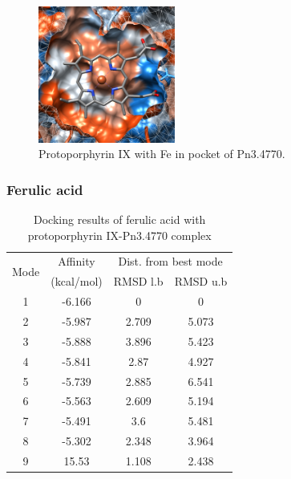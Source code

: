 \documentclass[12pt]{article}
\begin{document}
	\FloatBarrier
	
	\FloatBarrier
	\begin{figure}[h!]
		\centering
		\includegraphics[width=0.4\textwidth]{../5/known/Dock/chimera.png}
		\caption{\centering Protoporphyrin IX with Fe in pocket of Pn3.4770.}
		\label{fig5k_5}
	\end{figure}
	\FloatBarrier
	
	\subsubsection{Ferulic acid}
	
	\begin{table}
		\centering
		\caption{\centering Docking results of ferulic acid with protoporphyrin IX-Pn3.4770 complex}
		\label{table5k_2}
		\begin{tabular}{cccc}
			\toprule
			\multirow{2}{*}{Mode} & Affinity & \multicolumn{2}{c}{Dist. from best mode}\\
			&  (kcal/mol) & RMSD l.b & RMSD u.b\\
			\midrule
			1 & -6.166   &       0   &       0\\
			2 & -5.987   &   2.709   &   5.073\\
			3 & -5.888   &   3.896   &   5.423\\
			4 & -5.841   &    2.87   &   4.927\\
			5 & -5.739   &   2.885   &   6.541\\
			6 & -5.563   &   2.609   &   5.194\\
			7 & -5.491   &     3.6   &   5.481\\
			8 & -5.302   &   2.348   &   3.964\\
			9 &  15.53   &   1.108   &   2.438\\
			\bottomrule
			
		\end{tabular}
	\end{table}
	
\end{document}
